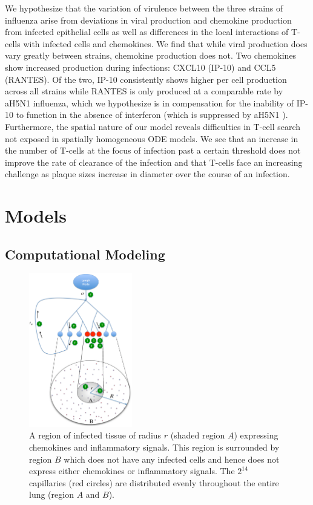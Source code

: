 \documentclass[10pt]{article}
\begin{document}
We hypothesize that the variation of virulence between the three strains of influenza arise from deviations in viral production and chemokine production from infected epithelial cells as well as differences in the local interactions of T-cells with infected cells and chemokines.  We find that while viral production does vary greatly between strains, chemokine production does not.  Two chemokines show increased production during infections: CXCL10 (IP-10) and CCL5 (RANTES).  Of the two, IP-10 consistently shows higher per cell production across all strains while RANTES is only produced at a comparable rate by aH5N1 influenza, which we hypothesize is in compensation for the inability of IP-10 to function in the absence of interferon (which is suppressed by aH5N1 \cite{Mitchell2011}).  Furthermore, the spatial nature of our model reveals difficulties in T-cell search not exposed in spatially homogeneous ODE models.  We see that an increase in the number of T-cells at the focus of infection past a certain threshold does not improve the rate of clearance of the infection and that T-cells face an increasing challenge as plaque sizes increase in diameter over the course of an infection.

\section*{Models}


\subsection*{Computational Modeling}

\begin{figure}[ht!]
\begin{center}
\includegraphics[width=0.4\textwidth]{SystemChart}
\end{center}
\caption{A region of infected tissue of radius $r$ (shaded region $A$) expressing chemokines and inflammatory signals. This region is surrounded by region $B$ which does not have any infected cells and hence does not express either chemokines or inflammatory signals. The $2^{14}$ capillaries (red circles) are distributed evenly throughout the entire lung (region $A$ and $B$).}
\label{fig:systemchart}
\end{figure}
\end{document}
